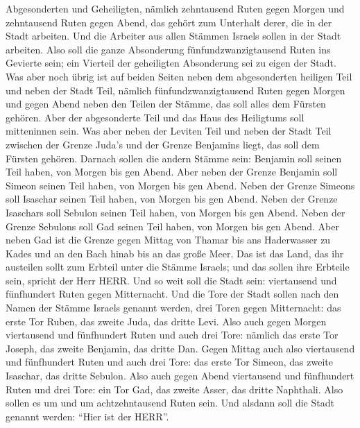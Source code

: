 Abgesonderten und Geheiligten, nämlich zehntausend Ruten gegen Morgen
und zehntausend Ruten gegen Abend, das gehört zum Unterhalt derer, die
in der Stadt arbeiten.  Und die Arbeiter aus allen Stämmen
Israels sollen in der Stadt arbeiten.  Also soll die ganze
Absonderung fünfundzwanzigtausend Ruten ins Gevierte sein; ein Vierteil
der geheiligten Absonderung sei zu eigen der Stadt.  Was
aber noch übrig ist auf beiden Seiten neben dem abgesonderten heiligen
Teil und neben der Stadt Teil, nämlich fünfundzwanzigtausend Ruten gegen
Morgen und gegen Abend neben den Teilen der Stämme, das soll alles dem
Fürsten gehören. Aber der abgesonderte Teil und das Haus des Heiligtums
soll mitteninnen sein.  Was aber neben der Leviten Teil und
neben der Stadt Teil zwischen der Grenze Juda's und der Grenze Benjamins
liegt, das soll dem Fürsten gehören.  Darnach sollen die
andern Stämme sein: Benjamin soll seinen Teil haben, von Morgen bis gen
Abend.  Aber neben der Grenze Benjamin soll Simeon seinen
Teil haben, von Morgen bis gen Abend.  Neben der Grenze
Simeons soll Isaschar seinen Teil haben, von Morgen bis gen Abend.
 Neben der Grenze Isaschars soll Sebulon seinen Teil haben,
von Morgen bis gen Abend.  Neben der Grenze Sebulons soll
Gad seinen Teil haben, von Morgen bis gen Abend.  Aber
neben Gad ist die Grenze gegen Mittag von Thamar bis ans Haderwasser zu
Kades und an den Bach hinab bis an das große Meer.  Das ist
das Land, das ihr austeilen sollt zum Erbteil unter die Stämme Israels;
und das sollen ihre Erbteile sein, spricht der Herr HERR. 
Und so weit soll die Stadt sein: viertausend und fünfhundert Ruten gegen
Mitternacht.  Und die Tore der Stadt sollen nach den Namen
der Stämme Israels genannt werden, drei Toren gegen Mitternacht: das
erste Tor Ruben, das zweite Juda, das dritte Levi.  Also
auch gegen Morgen viertausend und fünfhundert Ruten und auch drei Tore:
nämlich das erste Tor Joseph, das zweite Benjamin, das dritte Dan.
 Gegen Mittag auch also viertausend und fünfhundert Ruten
und auch drei Tore: das erste Tor Simeon, das zweite Isaschar, das
dritte Sebulon.  Also auch gegen Abend viertausend und
fünfhundert Ruten und drei Tore: ein Tor Gad, das zweite Asser, das
dritte Naphthali.  Also sollen es um und um achtzehntausend
Ruten sein. Und alsdann soll die Stadt genannt werden: ``Hier ist der
HERR''.
